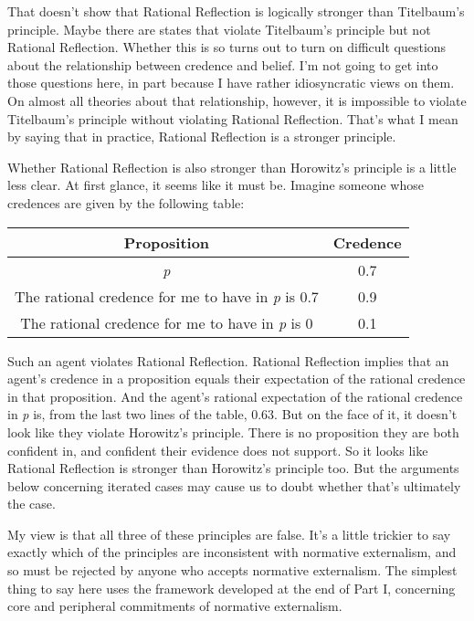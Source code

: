 That doesn't show that Rational Reflection is logically stronger than Titelbaum's principle. Maybe there are states that violate Titelbaum's principle but not Rational Reflection. Whether this is so turns out to turn on difficult questions about the relationship between credence and belief. I'm not going to get into those questions here, in part because I have rather idiosyncratic views on them. On almost all theories about that relationship, however, it is impossible to violate Titelbaum's principle without violating Rational Reflection. That's what I mean by saying that in practice, Rational Reflection is a stronger principle.

Whether Rational Reflection is also stronger than Horowitz's principle is a little less clear. At first glance, it seems like it must be. Imagine someone whose credences are given by the following table:

\begin{table}[htbp]
\begin{minipage}{\linewidth}
\setlength{\tymax}{0.5\linewidth}
\centering
\small
\begin{tabulary}{\textwidth}{@{}cc@{}} \toprule
 Proposition & Credence \\
\midrule

 \emph{p} & 0.7 \\
 The rational credence for me to have in \emph{p} is 0.7 & 0.9 \\
 The rational credence for me to have in \emph{p} is 0 & 0.1 \\
\bottomrule

\end{tabulary}
\end{minipage}
\end{table}

Such an agent violates Rational Reflection. Rational Reflection implies that an agent's credence in a proposition equals their expectation of the rational credence in that proposition. And the agent's rational expectation of the rational credence in \emph{p} is, from the last two lines of the table, 0.63. But on the face of it, it doesn't look like they violate Horowitz's principle. There is no proposition they are both confident in, and confident their evidence does not support. So it looks like Rational Reflection is stronger than Horowitz's principle too. But the arguments below concerning iterated cases may cause us to doubt whether that's ultimately the case.

My view is that all three of these principles are false. It's a little trickier to say exactly which of the principles are inconsistent with normative externalism, and so must be rejected by anyone who accepts normative externalism. The simplest thing to say here uses the framework developed at the end of Part I, concerning core and peripheral commitments of normative externalism.


